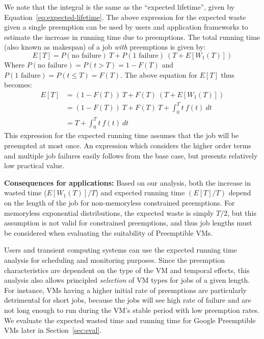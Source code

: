 We note that the integral is the same as the ``expected lifetime'', given by Equation~\ref{eq:expected-lifetime}.
%
The above expression for the expected waste given a single preemption can be used by users and application frameworks to estimate the increase in running time due to preemptions. %
The total running time (also known as makespan) of a job \emph{with} preemptions is given by:
\begin{equation}
  \label{eq:tot-run-time}
  E[T] = P(\text{no failure})~T + P(\text{1 failure})~(T + E[W_1(T)])
\end{equation}
Where $P(\text{no failure}) = P(t > T) =  1- F(T)$ and $P(\text{1 failure}) = P(t \leq T) = F(T)$.
The above equation for $E[T]$ thus becomes: 
%
\begin{align}
  \label{eq:tot-run-time-2}
  E[T] &= (1-F(T))~T + F(T)~(T + E[W_1(T)]) \\ \nonumber
  &= (1-F(T))~T + F(T)~T + \int_0^{T} t~f(t)~dt \\ \nonumber
       &= T + \int_0^{T} t~f(t)~dt         
\end{align}
This expression for the expected running time assumes that the job will be preempted at most once.
An expression which considers the higher order terms and multiple job failures easily follows from the base case, but presents relatively low practical value.



\noindent \textbf{Consequences for applications:}
Based on our analysis, both the increase in wasted time ($E[W_1(T)]/T$) and expected running time $(E[T]/T)$ depend on the length of the job for non-memoryless constrained preemptions. 
For memoryless exponential distributions, the expected waste is simply $T/2$, but this assumption is not valid for constrained preemptions, and thus job lengths must be considered when evaluating the suitability of Preemptible VMs. 


Users and transient computing systems can use the expected running time analysis for scheduling and monitoring purposes.
Since the preemption characteristics are dependent on the type of the VM and temporal effects, this analysis also allows principled \emph{selection} of VM types for jobs of a given length. 
For instance, VMs having a higher initial rate of preemptions are particularly detrimental for short jobs, because the jobs will see high rate of failure and are not long enough to run during the VM's stable period with low  preemption rates. 
We evaluate the expected wasted time and running time for Google Preemptible VMs later in Section~\ref{sec:eval}. 

